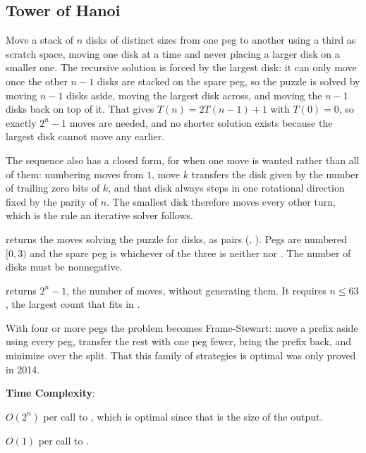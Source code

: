 \subsection{Tower of Hanoi}
\label{sec:1.8.3}
Move a stack of $n$ disks of distinct sizes from one peg to another using a third as scratch space, moving one disk at a time and never placing a larger disk on a smaller one. The recursive solution is forced by the largest disk: it can only move once the other $n - 1$ disks are stacked on the spare peg, so the puzzle is solved by moving $n - 1$ disks aside, moving the largest disk across, and moving the $n - 1$ disks back on top of it. That gives $T(n) = 2T(n - 1) + 1$ with $T(0) = 0$, so exactly $2^n - 1$ moves are needed, and no shorter solution exists because the largest disk cannot move any earlier.

The sequence also has a closed form, for when one move is wanted rather than all of them: numbering moves from $1$, move $k$ transfers the disk given by the number of trailing zero bits of $k$, and that disk always steps in one rotational direction fixed by the parity of $n$. The smallest disk therefore moves every other turn, which is the rule an iterative solver follows.

\begin{compactitem}
  \item {} returns the moves solving the puzzle for  disks, as pairs (, ). Pegs are numbered $[0, 3)$ and the spare peg is whichever of the three is neither  nor . The number of disks must be nonnegative.
  \item {} returns $2^n - 1$, the number of moves, without generating them. It requires $n \leq 63$, the largest count that fits in .
\end{compactitem}

With four or more pegs the problem becomes Frame-Stewart: move a prefix aside using every peg, transfer the rest with one peg fewer, bring the prefix back, and minimize over the split. That this family of strategies is optimal was only proved in 2014.

\textbf{Time Complexity}:
\begin{compactitem}
  \item $O(2^{n})$ per call to , which is optimal since that is the size of the output.
  \item $O(1)$ per call to .
\end{compactitem}

